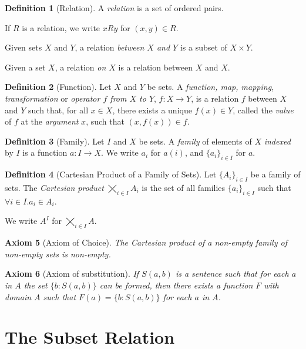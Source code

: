 \documentclass{report}
\newtheorem{ax}{Axiom}[chapter]
\theoremstyle{definition}
\newtheorem{df}[ax]{Definition}
\begin{document}
\begin{df}[Relation]
A \emph{relation} is a set of ordered pairs.

If $R$ is a relation, we write $xRy$ for $(x,y) \in R$.

Given sets $X$ and $Y$, a relation \emph{between $X$ and $Y$} is a subset of $X \times Y$.

Given a set $X$, a relation \emph{on $X$} is a relation between $X$ and $X$.
\end{df}

\begin{df}[Function]
Let $X$ and $Y$ be sets. A \emph{function, map, mapping, transformation} or \emph{operator $f$ from $X$ to $Y$}, $f : X \rightarrow Y$, is a relation $f$ between $X$ and $Y$ such that, for all $x \in X$, there exists a unique $f(x) \in Y$, called the \emph{value} of $f$ at the \emph{argument} $x$, such that $(x,f(x)) \in f$.
\end{df}

\begin{df}[Family]
Let $I$ and $X$ be sets. A \emph{family} of elements of $X$ \emph{indexed} by $I$ is a function $a : I \rightarrow X$. We write $a_i$ for $a(i)$, and $\{a_i\}_{i \in I}$ for $a$.
\end{df}

\begin{df}[Cartesian Product of a Family of Sets]
Let $\{A_i\}_{i \in I}$ be a family of sets. The \emph{Cartesian product} $\bigtimes_{i \in I} A_i$ is the set of all families $\{a_i\}_{i \in I}$ such that $\forall i \in I. a_i \in A_i$.

We write $A^I$ for $\bigtimes_{i \in I} A$.
\end{df}

\begin{ax}[Axiom of Choice]
The Cartesian product of a non-empty family of non-empty sets is non-empty.
\end{ax}

\begin{ax}[Axiom of substitution]
If $S(a,b)$ is a sentence such that for each $a$ in $A$ the set $\{ b : S(a,b) \}$ can be formed, then there exists a function $F$ with domain $A$ such that $F(a) = \{ b : S(a,b) \}$ for each $a$ in $A$.
\end{ax}

\section{The Subset Relation}
\end{document}
